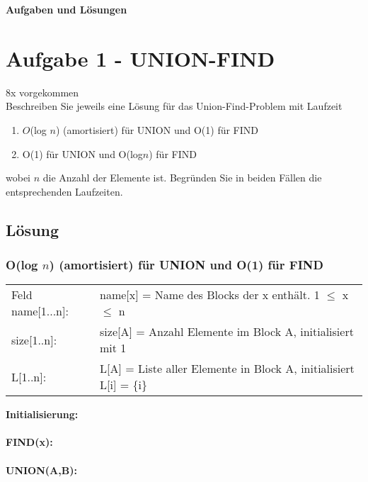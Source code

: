 \documentclass[10pt,a4paper]{article}
\begin{document}
\begin{center}
	{\huge \textbf{Aufgaben und Lösungen}}
\end{center}



\section*{Aufgabe 1 - UNION-FIND}
8x vorgekommen \\
Beschreiben Sie jeweils eine Lösung für das Union-Find-Problem mit Laufzeit
\begin{enumerate}
	\item $O$(log $n$) (amortisiert) für UNION und O(1) für FIND
	\item O(1) für UNION und O(log$n$) für FIND
\end{enumerate}	
wobei $n$ die Anzahl der Elemente ist. Begründen Sie in beiden Fällen die entsprechenden Laufzeiten.

\subsection*{Lösung}
\subsubsection*{O(log $n$) (amortisiert) für UNION und O(1) für FIND}

\begin{tabular}{ll}
	Feld name[1...n]:& name[x] = Name des Blocks der x enthält. 1 $\leq$ x $\leq$ n \\
	size[1..n]:& size[A] = Anzahl Elemente im Block A, initialisiert mit 1 \\ 
	L[1..n]: & L[A] = Liste aller Elemente in Block A, initialisiert L[i] = \{i\}
\end{tabular}
\begin{algorithm}[H]
	
	\textbf{Initialisierung:}	\\
	~\\
	\textbf{FIND(x):} \\
	~\\
	\textbf{UNION(A,B):} \\
	
	
\end{algorithm}
\end{document}
